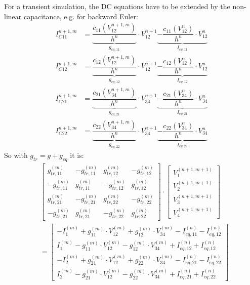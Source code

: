 For a transient simulation, the DC equations have to be extended
by the non-linear capacitance, e.g. for backward Euler:
\begin{align}
I_{C11}^{n+1,m} &=
   \underbrace{\dfrac{c_{11}(V_{12}^{n+1,m})}{h^n}}_{g_{eq,11}}\cdot V_{12}^{n+1}
   \underbrace{- \dfrac{c_{11}(V_{12}^{n})}{h^n}\cdot V_{12}^{n}}_{I_{eq,11}}\\
I_{C12}^{n+1,m} &=
   \underbrace{\dfrac{c_{12}(V_{12}^{n+1,m})}{h^n}}_{g_{eq,12}}\cdot V_{12}^{n+1}
   \underbrace{- \dfrac{c_{12}(V_{12}^{n})}{h^n}\cdot V_{12}^{n}}_{I_{eq,12}}\\
I_{C21}^{n+1,m} &=
   \underbrace{\dfrac{c_{21}(V_{34}^{n+1,m})}{h^n}}_{g_{eq,21}}\cdot V_{34}^{n+1}
   \underbrace{- \dfrac{c_{21}(V_{34}^{n})}{h^n}\cdot V_{34}^{n}}_{I_{eq,21}}\\
I_{C22}^{n+1,m} &=
   \underbrace{\dfrac{c_{22}(V_{34}^{n+1,m})}{h^n}}_{g_{eq,22}}\cdot V_{34}^{n+1}
   \underbrace{- \dfrac{c_{22}(V_{34}^{n})}{h^n}\cdot V_{34}^{n}}_{I_{eq,22}}
\end{align}
So with $g_{tr} = g + g_{eq}$ it is:
\begin{equation}
\begin{split}
&\begin{bmatrix}
 g_{tr,11}^{(m)} & -g_{tr,11}^{(m)} &  g_{tr,12}^{(m)} & -g_{tr,12}^{(m)}\\
-g_{tr,11}^{(m)} &  g_{tr,11}^{(m)} & -g_{tr,12}^{(m)} &  g_{tr,12}^{(m)}\\
 g_{tr,21}^{(m)} & -g_{tr,21}^{(m)} &  g_{tr,22}^{(m)} & -g_{tr,22}^{(m)}\\
-g_{tr,21}^{(m)} &  g_{tr,21}^{(m)} & -g_{tr,22}^{(m)} &  g_{tr,22}^{(m)}
\end{bmatrix}
\cdot
\begin{bmatrix}
V_{1}^{(n+1,m+1)}\\
V_{2}^{(n+1,m+1)}\\
V_{3}^{(n+1,m+1)}\\
V_{4}^{(n+1,m+1)}
\end{bmatrix} \\
&=
\begin{bmatrix}
-I_1^{(m)} + g_{11}^{(m)}\cdot V_{12}^{(m)} + g_{12}^{(m)}\cdot V_{34}^{(m)} - I_{eq,11}^{(n)} - I_{eq,12}^{(n)}\\
 I_1^{(m)} - g_{11}^{(m)}\cdot V_{12}^{(m)} - g_{12}^{(m)}\cdot V_{34}^{(m)} + I_{eq,12}^{(n)} + I_{eq,12}^{(n)}\\
-I_2^{(m)} + g_{21}^{(m)}\cdot V_{12}^{(m)} + g_{22}^{(m)}\cdot V_{34}^{(m)} - I_{eq,21}^{(n)} - I_{eq,22}^{(n)}\\
 I_2^{(m)} - g_{21}^{(m)}\cdot V_{12}^{(m)} - g_{22}^{(m)}\cdot V_{34}^{(m)} + I_{eq,21}^{(n)} + I_{eq,22}^{(n)}
\end{bmatrix}
\end{split}
\end{equation}

